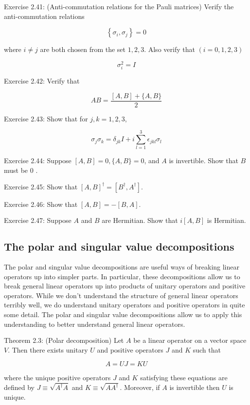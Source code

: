 \documentclass[
	11pt, %
	fleqn, %
	a4paper, %
]{LegrandOrangeBook}
\begin{document}
Exercise 2.41: (Anti-commutation relations for the Pauli matrices) Verify the anti-commutation relations

$$
\left\{\sigma_{i}, \sigma_{j}\right\}=0
$$

where $i \neq j$ are both chosen from the set $1,2,3$. Also verify that $(i=0,1,2,3)$

$$
\sigma_{i}^{2}=I
$$

Exercise 2.42: Verify that

$$
A B=\frac{[A, B]+\{A, B\}}{2}
$$

Exercise 2.43: Show that for $j, k=1,2,3$,

$$
\sigma_{j} \sigma_{k}=\delta_{j k} I+i \sum_{l=1}^{3} \epsilon_{j k l} \sigma_{l}
$$

Exercise 2.44: Suppose $[A, B]=0,\{A, B\}=0$, and $A$ is invertible. Show that $B$ must be 0 .

Exercise 2.45: Show that $[A, B]^{\dagger}=\left[B^{\dagger}, A^{\dagger}\right]$.

Exercise 2.46: Show that $[A, B]=-[B, A]$.

Exercise 2.47: Suppose $A$ and $B$ are Hermitian. Show that $i[A, B]$ is Hermitian.

\subsection{The polar and singular value decompositions}

The polar and singular value decompositions are useful ways of breaking linear operators up into simpler parts. In particular, these decompositions allow us to break general linear operators up into products of unitary operators and positive operators. While we don't understand the structure of general linear operators terribly well, we do understand unitary operators and positive operators in quite some detail. The polar and singular value decompositions allow us to apply this understanding to better understand general linear operators.

Theorem 2.3: (Polar decomposition) Let $A$ be a linear operator on a vector space $V$. Then there exists unitary $U$ and positive operators $J$ and $K$ such that

$$
A=U J=K U
$$

where the unique positive operators $J$ and $K$ satisfying these equations are defined by $J \equiv \sqrt{A^{\dagger} A}$ and $K \equiv \sqrt{A A^{\dagger}}$. Moreover, if $A$ is invertible then $U$ is unique.
\end{document}

